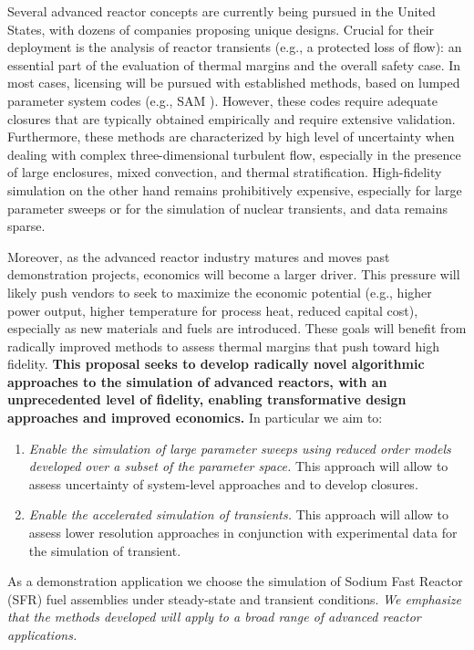 Several  advanced reactor concepts are currently being pursued in the United
States, with dozens of companies proposing unique designs. Crucial for their
deployment is the analysis of  reactor transients (e.g., a protected loss of
flow): an essential part of the evaluation of thermal margins and the overall
safety case.  In most cases, licensing will be pursued with established
methods, based on lumped parameter system codes (e.g., SAM \cite{hu2021}).
However, these codes require adequate closures that are typically obtained
empirically and require extensive validation. Furthermore, these methods are
characterized by high level of uncertainty when dealing with complex
three-dimensional turbulent flow, especially in the presence of large
enclosures, mixed convection, and thermal stratification. High-fidelity
simulation on the other hand remains prohibitively expensive, especially for
large parameter sweeps or for the simulation of nuclear transients, and data
remains sparse.

Moreover, as the advanced reactor industry matures and moves past demonstration
projects, economics will become a larger driver. This pressure will likely push
vendors to seek to maximize the economic potential (e.g., higher power output,
higher temperature for process heat, reduced capital cost), especially as new
materials and fuels are introduced. These goals will benefit from radically
improved methods to assess thermal margins that push toward high fidelity.
\textbf{This proposal seeks to develop radically novel algorithmic approaches
to the simulation of advanced reactors, with an unprecedented level of
fidelity, enabling transformative design approaches and improved economics.} 
In particular we aim to: 
\begin{enumerate}
%
   \item \textit{Enable the simulation of large parameter sweeps using reduced
   order models developed over a subset of the parameter space.} This approach
   will allow to assess uncertainty of system-level approaches and to develop
   closures.
%
   \item \textit{Enable the accelerated simulation of transients.}
   This approach will allow to assess lower resolution approaches in conjunction
   with experimental data for the simulation of transient.  
\end{enumerate}
As a demonstration application we choose the simulation of Sodium Fast Reactor
(SFR) fuel assemblies under steady-state and transient conditions. \textit{We
emphasize that the methods developed will apply to a broad range of advanced
reactor applications.}


